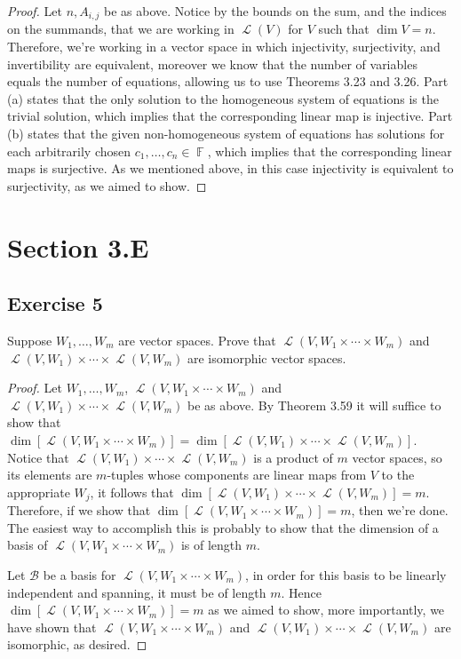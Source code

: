 \documentclass[letterpaper, 12pt]{amsart}
\DeclareMathOperator{\F}{\mathbb{F}}				%
\DeclareMathOperator{\Ell}{\mathscr{L}}				%
\theoremstyle{definition}  							%
\begin{document}
		\begin{proof}
		Let $n, A_{i,j}$ be as above.
		Notice by the bounds on the sum, and the indices on the summands, that we are working in $\Ell(V)$ for $V$ such that $\dim V = n$.
		Therefore, we're working in a vector space in which injectivity, surjectivity, and invertibility are equivalent, moreover we know that the number of variables equals the number of equations, allowing us to use Theorems 3.23 and 3.26.
		Part (a) states that the only solution to the homogeneous system of equations is the trivial solution, which implies that the corresponding linear map is injective. 
		Part (b) states that the given non-homogeneous system of equations has solutions for each arbitrarily chosen $c_{1}, \dots , c_{n} \in \F$, which implies that the corresponding linear maps is surjective.
		As we mentioned above, in this case injectivity is equivalent to surjectivity, as we aimed to show.
		\end{proof}

	\section*{Section 3.E}
		\subsection*{Exercise 5}
		Suppose $W_{1}, \dots, W_{m}$ are vector spaces. 
		Prove that $\Ell(V, W_{1} \times \cdots \times W_{m})$ and $\Ell(V,W_{1}) \times \cdots \times \Ell(V,W_{m})$ are isomorphic vector spaces.
		
		\begin{proof}
		Let $W_{1}, \dots, W_{m}$, $\Ell(V, W_{1} \times \cdots \times W_{m})$ and $\Ell(V,W_{1}) \times \cdots \times \Ell(V,W_{m})$ be as above.
		By Theorem 3.59 it will suffice to show that $\dim{[\Ell(V, W_{1} \times \cdots \times W_{m})]} = \dim{[\Ell(V,W_{1}) \times \cdots \times \Ell(V,W_{m})]}$.
		Notice that $\Ell(V,W_{1}) \times \cdots \times \Ell(V,W_{m})$ is a product of $m$ vector spaces, so its elements are $m$-tuples whose components are linear maps from $V$ to the appropriate $W_{j}$, it follows that $\dim{[\Ell(V,W_{1}) \times \cdots \times \Ell(V,W_{m})]} = m$.
		Therefore, if we show that $\dim{[\Ell(V, W_{1} \times \cdots \times W_{m})]} = m$, then we're done.
		The easiest way to accomplish this is probably to show that the dimension of a basis of $\Ell(V, W_{1} \times \cdots \times W_{m})$ is of length $m$.

		Let $\mathcal{B}$ be a basis for $\Ell(V,W_{1} \times \cdots \times W_{m})$, in order for this basis to be linearly independent and spanning, it must be of length $m$.
		Hence $\dim{[\Ell(V,W_{1} \times \cdots \times W_{m})]} = m$ as we aimed to show, more importantly, we have shown that $\Ell(V, W_{1} \times \cdots \times W_{m})$ and $\Ell(V,W_{1}) \times \cdots \times \Ell(V,W_{m})$ are isomorphic, as desired.
		\end{proof}
\end{document}
